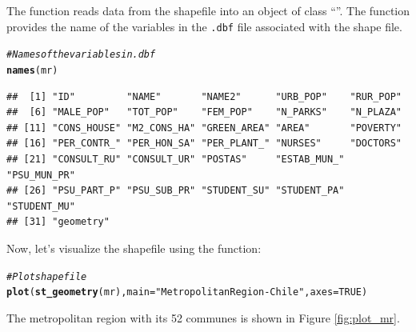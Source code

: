\documentclass[english,12pt]{book}\usepackage[]{graphicx}\usepackage[]{xcolor}
\makeatletter
\newcommand{\hlnum}[1]{\textcolor[rgb]{0.686,0.059,0.569}{#1}}%
\newcommand{\hlsng}[1]{\textcolor[rgb]{0.192,0.494,0.8}{#1}}%
\newcommand{\hlcom}[1]{\textcolor[rgb]{0.678,0.584,0.686}{\textit{#1}}}%
\newcommand{\hldef}[1]{\textcolor[rgb]{0.345,0.345,0.345}{#1}}%
\newcommand{\hlkwc}[1]{\textcolor[rgb]{0.333,0.667,0.333}{#1}}%
\newcommand{\hlkwd}[1]{\textcolor[rgb]{0.737,0.353,0.396}{\textbf{#1}}}%
\newenvironment{kframe}{%
 \def\at@end@of@kframe{}%
 \ifinner\ifhmode%
  \def\at@end@of@kframe{\end{minipage}}%
  \begin{minipage}{\columnwidth}%
 \fi\fi%
 \def\FrameCommand##1{\hskip\@totalleftmargin \hskip-\fboxsep
 \colorbox{shadecolor}{##1}\hskip-\fboxsep
     \hskip-\linewidth \hskip-\@totalleftmargin \hskip\columnwidth}%
 \MakeFramed {\advance\hsize-\width
   \@totalleftmargin\z@ \linewidth\hsize
   \@setminipage}}%
 {\par\unskip\endMakeFramed%
 \at@end@of@kframe}
\newenvironment{knitrout}{}{} %
\makeatother
\begin{document}
The  function reads data from the shapefile into an object of class ``''. The  function provides the name of the variables in the \texttt{.dbf} file associated with the shape file. 
\begin{knitrout}
\color{fgcolor}\begin{kframe}
\begin{alltt}
\hlcom{# Names of the variables in .dbf}
\hlkwd{names}\hldef{(mr)}
\end{alltt}
\begin{verbatim}
##  [1] "ID"         "NAME"       "NAME2"      "URB_POP"    "RUR_POP"   
##  [6] "MALE_POP"   "TOT_POP"    "FEM_POP"    "N_PARKS"    "N_PLAZA"   
## [11] "CONS_HOUSE" "M2_CONS_HA" "GREEN_AREA" "AREA"       "POVERTY"   
## [16] "PER_CONTR_" "PER_HON_SA" "PER_PLANT_" "NURSES"     "DOCTORS"   
## [21] "CONSULT_RU" "CONSULT_UR" "POSTAS"     "ESTAB_MUN_" "PSU_MUN_PR"
## [26] "PSU_PART_P" "PSU_SUB_PR" "STUDENT_SU" "STUDENT_PA" "STUDENT_MU"
## [31] "geometry"
\end{verbatim}
\end{kframe}
\end{knitrout}

Now, let's visualize the shapefile using the  function:
\begin{knitrout}
\color{fgcolor}\begin{kframe}
\begin{alltt}
\hlcom{# Plot shapefile}
\hlkwd{plot}\hldef{(}\hlkwd{st_geometry}\hldef{(mr),} \hlkwc{main} \hldef{=} \hlsng{"Metropolitan Region-Chile"}\hldef{,} \hlkwc{axes} \hldef{=} \hlnum{TRUE}\hldef{)}
\end{alltt}
\end{kframe}
\end{knitrout}

The metropolitan region with its 52 communes is shown in Figure \ref{fig:plot_mr}.
\end{document}
